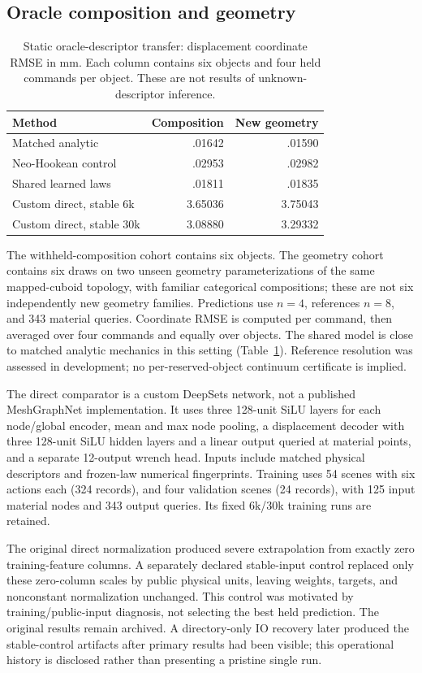 \documentclass[10pt,twocolumn,letterpaper]{article}
\begin{document}
\subsection{Oracle composition and geometry}
\begin{table}[t]
\centering\small
\begin{tabular}{lrr}
\toprule
Method & Composition & New geometry\\
\midrule
Matched analytic & .01642 & .01590\\
Neo-Hookean control & .02953 & .02982\\
Shared learned laws & .01811 & .01835\\
Custom direct, stable 6k & 3.65036 & 3.75043\\
Custom direct, stable 30k & 3.08880 & 3.29332\\
\bottomrule
\end{tabular}
\caption{Static oracle-descriptor transfer: displacement coordinate RMSE in mm. Each column contains six objects and four held commands per object. These are not results of unknown-descriptor inference.}
\label{sim-tab:oracle}
\end{table}
The withheld-composition cohort contains six objects. The geometry cohort contains six draws on two unseen geometry parameterizations of the same mapped-cuboid topology, with familiar categorical compositions; these are not six independently new geometry families. Predictions use $n=4$, references $n=8$, and 343 material queries. Coordinate RMSE is computed per command, then averaged over four commands and equally over objects. The shared model is close to matched analytic mechanics in this setting (Table~\ref{sim-tab:oracle}). Reference resolution was assessed in development; no per-reserved-object continuum certificate is implied.

The direct comparator is a custom DeepSets network, not a published MeshGraphNet implementation. It uses three 128-unit SiLU layers for each node/global encoder, mean and max node pooling, a displacement decoder with three 128-unit SiLU hidden layers and a linear output queried at material points, and a separate 12-output wrench head. Inputs include matched physical descriptors and frozen-law numerical fingerprints. Training uses 54 scenes with six actions each (324 records), and four validation scenes (24 records), with 125 input material nodes and 343 output queries. Its fixed 6k/30k training runs are retained.

The original direct normalization produced severe extrapolation from exactly zero training-feature columns. A separately declared stable-input control replaced only these zero-column scales by public physical units, leaving weights, targets, and nonconstant normalization unchanged. This control was motivated by training/public-input diagnosis, not selecting the best held prediction. The original results remain archived. A directory-only IO recovery later produced the stable-control artifacts after primary results had been visible; this operational history is disclosed rather than presenting a pristine single run.
\end{document}
